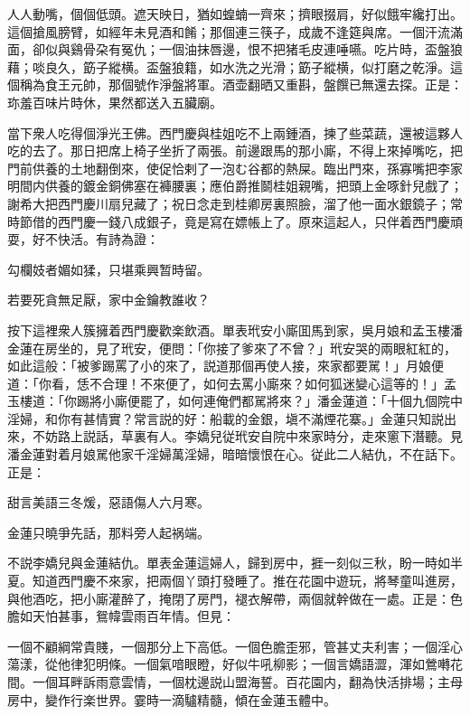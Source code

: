 \begin{myquote}
人人動嘴，個個低頭。遮天映日，猶如蝗蝻一齊來；擠眼掇肩，好似餓牢纔打出。這個搶風膀臂，如經年未見酒和餚；那個連三筷子，成歲不逢筵與席。一個汗流滿面，卻似與鷄骨朶有冤仇；一個油抹唇邊，恨不把猪毛皮連唾嚥。吃片時，盃盤狼藉；啖良久，筯子縱横。盃盤狼籍，如水洗之光滑；筯子縱横，似打磨之乾淨。這個稱為食王元帥，那個號作淨盤將軍。酒壶翻晒又重斟，盤饌已無還去探。正是：珎羞百味片時休，果然都送入五臟廟。
\end{myquote}

當下衆人吃得個淨光王佛。西門慶與桂姐吃不上兩鍾酒，揀了些菜蔬，還被這夥人吃的去了。那日把席上椅子坐折了兩張。前邊跟馬的那小廝，不得上來掉嘴吃，把門前供養的土地翻倒來，使促恰剌了一泡む谷都的熱屎。臨出門來，孫寡嘴把李家明間内供養的鍍金銅佛塞在褲腰裏；應伯爵推鬬桂姐親嘴，把頭上金啄針兒戲了；謝希大把西門慶川扇兒藏了；祝日念走到桂卿房裏照臉，溜了他一面水銀鏡子；常時節借的西門慶一錢八成銀子，竟是寫在嫖帳上了。原來這起人，只伴着西門慶頑耍，好不快活。有詩為證：

\begin{myquote}
勾欄妓者媚如猱，只堪乘興暂時留。

若要死貪無足厭，家中金鑰教誰收？
\end{myquote}

按下這裡衆人簇擁着西門慶歡楽飲酒。單表玳安小廝囬馬到家，吳月娘和孟玉樓潘金蓮在房坐的，見了玳安，便問：「你接了爹來了不曾？」玳安哭的兩眼紅紅的，如此這般：「被爹踢罵了小的來了，説道那個再使人接，來家都要駡！」月娘便道：「你看，恁不合理！不來便了，如何去罵小廝來？如何狐迷變心這等的！」孟玉樓道：「你踢將小廝便罷了，如何連俺們都駡將來？」潘金蓮道：「十個九個院中淫婦，和你有甚情實？常言説的好：船載的金銀，塡不滿煙花寨。」金蓮只知説出來，不妨路上説話，草裏有人。李嬌兒従玳安自院中來家時分，走來窻下潛聽。見潘金蓮對着月娘駡他家千淫婦萬淫婦，暗暗懷恨在心。従此二人結仇，不在話下。正是：

\begin{myquote}
甜言美語三冬煖，惡語傷人六月寒。

金蓮只曉爭先話，那料旁人起祸端。
\end{myquote}

不説李嬌兒與金蓮結仇。單表金蓮這婦人，歸到房中，捱一刻似三秋，盼一時如半夏。知道西門慶不來家，把兩個丫頭打發睡了。推在花園中遊玩，將琴童叫進房，與他酒吃，把小廝灌醉了，掩閉了房門，褪衣解帶，兩個就幹做在一處。正是：色膽如天怕甚事，鴛幃雲雨百年情。但見：

\begin{myquote}
一個不顧綱常貴賤，一個那分上下高低。一個色膽歪邪，管甚丈夫利害；一個淫心蕩漾，從他律犯明條。一個氣喑眼瞪，好似牛吼柳影；一個言嬌語澀，渾如鶯囀花間。一個耳畔訴雨意雲情，一個枕邊説山盟海誓。百花園内，翻為快活排場；主母房中，變作行楽世界。霎時一滴驢精髓，傾在金蓮玉體中。
\end{myquote}

